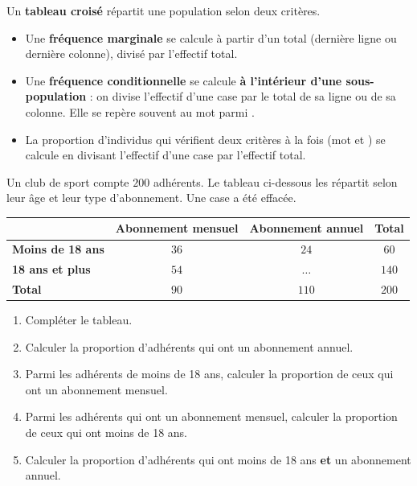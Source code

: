 \documentclass[10pt,a4paper]{article}
\begin{document}
\begin{bloc}
\begin{defis}
Un \textbf{tableau croisé} répartit une population selon deux critères.
\begin{itemize}
    \item Une \textbf{fréquence marginale} se calcule à partir d'un total (dernière ligne ou dernière colonne), divisé par l'effectif total.
    \item Une \textbf{fréquence conditionnelle} se calcule \textbf{à l'intérieur d'une sous-population} : on divise l'effectif d'une case par le total de sa ligne ou de sa colonne. Elle se repère souvent au mot \og parmi \fg{}.
    \item La proportion d'individus qui vérifient deux critères à la fois (mot \og et \fg{}) se calcule en divisant l'effectif d'une case par l'effectif total.
\end{itemize}
\end{defis}
\end{bloc}

\begin{bloc}
\begin{exple}
Un club de sport compte \(200\) adhérents. Le tableau ci-dessous les répartit selon leur âge et leur type d'abonnement. Une case a été effacée.

\begin{center}
\renewcommand{\arraystretch}{1.5}
\begin{tabular}{|l|c|c|c|}
    \hline
    & \textbf{Abonnement mensuel} & \textbf{Abonnement annuel} & \textbf{Total} \\
    \hline
    \textbf{Moins de 18 ans} & \(36\) & \(24\) & \(60\) \\
    \hline
    \textbf{18 ans et plus} & \(54\) & \(\dots\) & \(140\) \\
    \hline
    \textbf{Total} & \(90\) & \(110\) & \(200\) \\
    \hline
\end{tabular}
\end{center}

\begin{enumerate}[leftmargin=*]
    \item Compléter le tableau.
    \item Calculer la proportion d'adhérents qui ont un abonnement annuel.
    \item Parmi les adhérents de moins de 18 ans, calculer la proportion de ceux qui ont un abonnement mensuel.
    \item Parmi les adhérents qui ont un abonnement mensuel, calculer la proportion de ceux qui ont moins de 18 ans.
    \item Calculer la proportion d'adhérents qui ont moins de 18 ans \textbf{et} un abonnement annuel.
\end{enumerate}
\end{exple}
\end{bloc}
\end{document}

